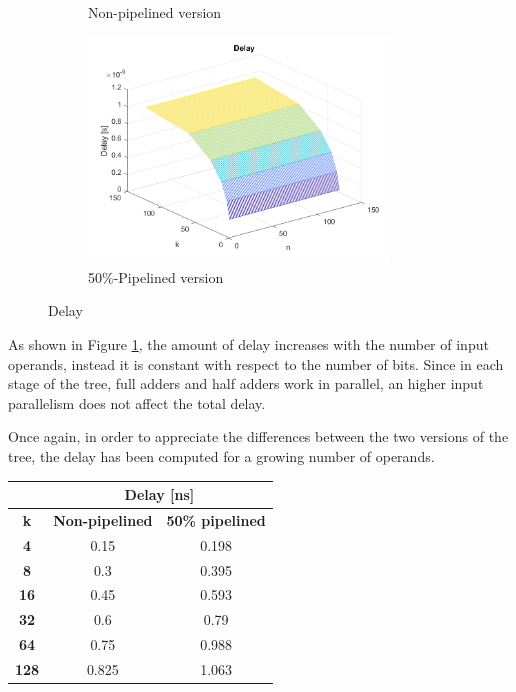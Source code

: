 \begin{figure}[H]
{\begin{subfigure}{0.55\textwidth}
			\caption{Non-pipelined version}
		\end{subfigure}
		\begin{subfigure}{0.55\textwidth}
			\includegraphics[width=8cm]{immagini/radix2ppipe2/delay3D.png}
			\caption{50\%-Pipelined version}
		\end{subfigure}
	}
	\caption{Delay}
	\label{fig:Delay}
\end{figure}

As shown in Figure \ref{fig:Delay}, the amount of delay increases with the number of input operands, instead it is constant with respect to the number of bits. Since in each stage of the tree, full adders and half adders work in parallel, an higher input parallelism does not affect the total delay.

Once again, in order to appreciate the differences between the two versions of the tree, the delay has been computed for a growing number of operands.

\begin{center}
	\begin{tabular}{c|c|c|}
		\cline{2-3}
		\textbf{}                          & \multicolumn{2}{c|}{\textbf{Delay {[}ns{]}}}     \\ \hline
		\multicolumn{1}{|c|}{\textbf{k}}   & \textbf{Non-pipelined} & \textbf{50\% pipelined} \\ \hline
		\multicolumn{1}{|c|}{\textbf{4}}   & 0.15                   & 0.198                   \\ \hline
		\multicolumn{1}{|c|}{\textbf{8}}   & 0.3                    & 0.395                   \\ \hline
		\multicolumn{1}{|c|}{\textbf{16}}  & 0.45                   & 0.593                   \\ \hline
		\multicolumn{1}{|c|}{\textbf{32}}  & 0.6                    & 0.79                    \\ \hline
		\multicolumn{1}{|c|}{\textbf{64}}  & 0.75                   & 0.988                   \\ \hline
		\multicolumn{1}{|c|}{\textbf{128}} & 0.825                  & 1.063                    \\ \hline
	\end{tabular}
\end{center}

